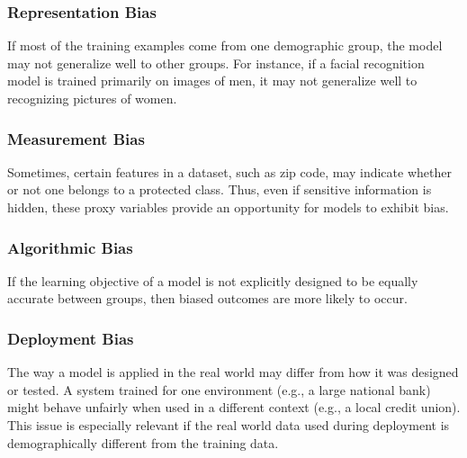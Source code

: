 \subsubsection{Representation Bias}
If most of the training examples come from one demographic group, the model may not generalize well to other groups. For instance, if a facial recognition model is trained primarily on images of men, it may not generalize well to recognizing pictures of women.


\subsubsection{Measurement Bias}
Sometimes, certain features in a dataset, such as zip code, may indicate whether or not one belongs to a protected class. Thus, even if sensitive information is hidden, these proxy variables provide an opportunity for models to exhibit bias. 

\subsubsection{Algorithmic Bias} 
\par If the learning objective of a model is not explicitly designed to be equally accurate between groups, then biased outcomes are more likely to occur.

\subsubsection{Deployment Bias}
The way a model is applied in the real world may differ from how it was designed or tested. A system trained for one environment (e.g., a large national bank) might behave unfairly when used in a different context (e.g., a local credit union). This issue is especially relevant if the real world data used during deployment is demographically different from the training data.
